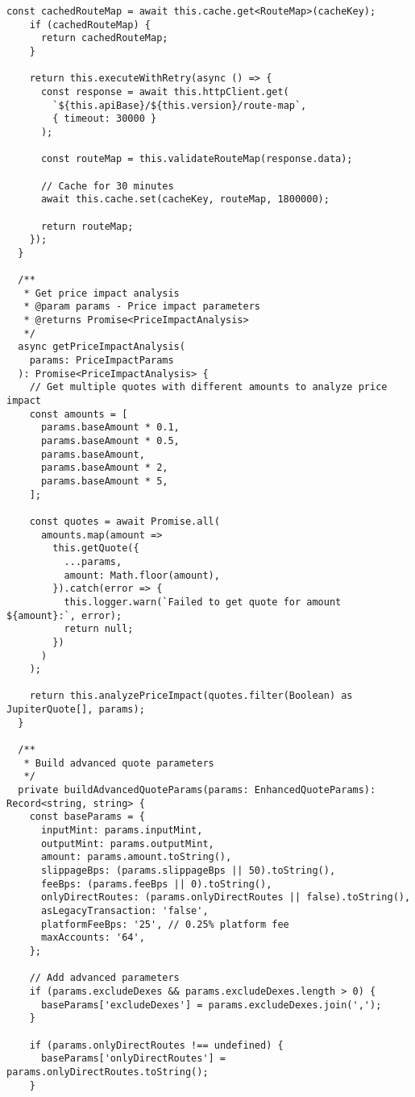 \documentclass[11pt,a4paper]{article}
\begin{document}
\begin{lstlisting}[style=typescript, caption=Advanced Jupiter API v6 Service]
    const cachedRouteMap = await this.cache.get<RouteMap>(cacheKey);
    if (cachedRouteMap) {
      return cachedRouteMap;
    }

    return this.executeWithRetry(async () => {
      const response = await this.httpClient.get(
        `${this.apiBase}/${this.version}/route-map`,
        { timeout: 30000 }
      );

      const routeMap = this.validateRouteMap(response.data);
      
      // Cache for 30 minutes
      await this.cache.set(cacheKey, routeMap, 1800000);
      
      return routeMap;
    });
  }

  /**
   * Get price impact analysis
   * @param params - Price impact parameters
   * @returns Promise<PriceImpactAnalysis>
   */
  async getPriceImpactAnalysis(
    params: PriceImpactParams
  ): Promise<PriceImpactAnalysis> {
    // Get multiple quotes with different amounts to analyze price impact
    const amounts = [
      params.baseAmount * 0.1,
      params.baseAmount * 0.5,
      params.baseAmount,
      params.baseAmount * 2,
      params.baseAmount * 5,
    ];

    const quotes = await Promise.all(
      amounts.map(amount => 
        this.getQuote({
          ...params,
          amount: Math.floor(amount),
        }).catch(error => {
          this.logger.warn(`Failed to get quote for amount ${amount}:`, error);
          return null;
        })
      )
    );

    return this.analyzePriceImpact(quotes.filter(Boolean) as JupiterQuote[], params);
  }

  /**
   * Build advanced quote parameters
   */
  private buildAdvancedQuoteParams(params: EnhancedQuoteParams): Record<string, string> {
    const baseParams = {
      inputMint: params.inputMint,
      outputMint: params.outputMint,
      amount: params.amount.toString(),
      slippageBps: (params.slippageBps || 50).toString(),
      feeBps: (params.feeBps || 0).toString(),
      onlyDirectRoutes: (params.onlyDirectRoutes || false).toString(),
      asLegacyTransaction: 'false',
      platformFeeBps: '25', // 0.25% platform fee
      maxAccounts: '64',
    };

    // Add advanced parameters
    if (params.excludeDexes && params.excludeDexes.length > 0) {
      baseParams['excludeDexes'] = params.excludeDexes.join(',');
    }

    if (params.onlyDirectRoutes !== undefined) {
      baseParams['onlyDirectRoutes'] = params.onlyDirectRoutes.toString();
    }


\end{lstlisting}
\end{document}
